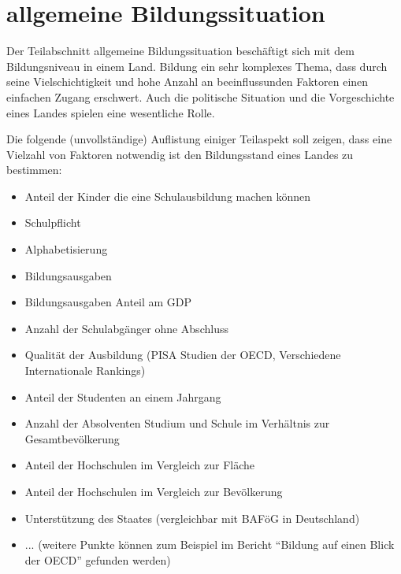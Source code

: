 \section{allgemeine Bildungssituation}
Der Teilabschnitt allgemeine Bildungssituation beschäftigt sich mit dem Bildungsniveau in einem Land. Bildung ein sehr komplexes Thema, dass durch seine Vielschichtigkeit und hohe Anzahl an beeinflussunden Faktoren einen einfachen Zugang erschwert. Auch die politische Situation und die Vorgeschichte eines Landes spielen eine wesentliche Rolle.

Die folgende (unvollständige) Auflistung einiger Teilaspekt soll zeigen, dass eine Vielzahl von Faktoren notwendig ist den Bildungsstand eines Landes zu bestimmen:
\begin{itemize} 
\item Anteil der Kinder die eine Schulausbildung machen können
\item Schulpflicht
\item Alphabetisierung
\item Bildungsausgaben
\item Bildungsausgaben Anteil am GDP
\item Anzahl der Schulabgänger ohne Abschluss
\item Qualität der Ausbildung (PISA Studien der OECD, Verschiedene Internationale Rankings)
\item Anteil der Studenten an einem Jahrgang
\item Anzahl der Absolventen Studium und Schule im Verhältnis zur Gesamtbevölkerung
\item Anteil der Hochschulen im Vergleich zur Fläche
\item Anteil der Hochschulen im Vergleich zur Bevölkerung
\item Unterstützung des Staates (vergleichbar mit BAFöG in Deutschland)
\item ... (weitere Punkte können zum Beispiel im Bericht ``Bildung auf einen Blick der OECD'' gefunden werden)
\end{itemize}


